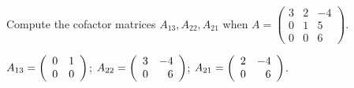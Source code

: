 \documentclass{ximera}
\begin{document}
\begin{exercise} \label{c10.1.b7a}
Compute the cofactor matrices $A_{13}, A_{22}, A_{21}$ when 
$A = \left( \begin{array}{rrr}
 3 & 2 & -4\\
 0 & 1 & 5\\
 0 & 0 & 6\end{array} \right)$.

\begin{solution}

$A_{13} = \left(\begin{array}{rr} 0 & 1\\ 0 &0\end{array}\right)$;
$A_{22} = \left(\begin{array}{rr} 3 & -4\\ 0 &6\end{array}\right)$;
$A_{21} = \left(\begin{array}{rr} 2 & -4\\ 0 &6\end{array}\right)$.

\end{solution}
\end{exercise}
\end{document}
